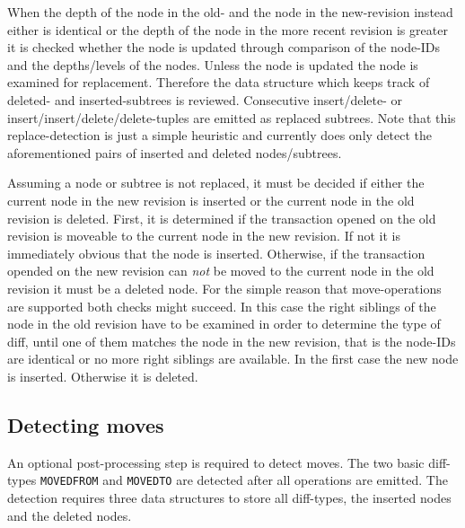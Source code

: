 When the depth of the node in the old- and the node in the new-revision instead either is identical or the depth of the node in the more recent revision is greater it is checked whether the node is updated through comparison of the node-IDs and the depths/levels of the nodes. Unless the node is updated the node is examined for replacement. Therefore the data structure which keeps track of deleted- and inserted-subtrees is reviewed. Consecutive insert/delete- or insert/insert/delete/delete-tuples are emitted as replaced subtrees. Note that this replace-detection is just a simple heuristic and currently does only detect the aforementioned pairs of inserted and deleted nodes/subtrees.%

Assuming a node or subtree is not replaced, it must be decided if either the current node in the new revision is inserted or the current node in the old revision is deleted. First, it is determined if the transaction opened on the old revision is moveable to the current node in the new revision. If not it is immediately obvious that the node is inserted. Otherwise, if the transaction opended on the new revision can \emph{not} be moved to the current node in the old revision it must be a deleted node. For the simple reason that move-operations are supported both checks might succeed. In this case the right siblings of the node in the old revision have to be examined in order to determine the type of diff, until one of them matches the node in the new revision, that is the node-IDs are identical or no more right siblings are available. In the first case the new node is inserted. Otherwise it is deleted.

\subsection{Detecting moves}
An optional post-processing step is required to detect moves. The two basic diff-types \texttt{MOVEDFROM} and \texttt{MOVEDTO} are detected after all operations are emitted. The detection requires three data structures to store all diff-types, the inserted nodes and the deleted nodes.

